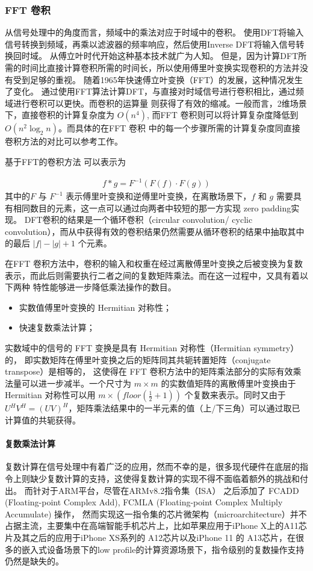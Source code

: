 \subsubsection{FFT 卷积}
从信号处理中的角度而言，频域中的乘法对应于时域中的卷积。 使用DFT将输入信号转换到频域，再乘以滤波器的频率响应，然后使用Inverse DFT将输入信号转换回时域。
从傅立叶时代开始这种基本技术就广为人知。 但是，因为计算DFT所需的时间比直接计算卷积所需的时间长，所以使用傅里叶变换实现卷积的方法并没有受到足够的重视。
随着1965年快速傅立叶变换（FFT）的发展，这种情况发生了变化。 通过使用FFT算法计算DFT，与直接对时域信号进行卷积相比，通过频域进行卷积可以更快。而卷积的运算量
则获得了有效的缩减。一般而言，2维场景下，直接卷积的计算复杂度为 $O(n^4)$, 而FFT 卷积则可以将计算复杂度降低到 $O(n^2 \log_{2}n)$。而具体的在FFT 卷积
中的每一个步骤所需的计算复杂度同直接卷积方法的对比可以参考工作\cite{Mathieu2013FastTO}。

基于FFT的卷积方法\cite{Zlateski2018FFTCA} \cite{Mathieu2013FastTO}可以表示为

\begin{align}
  f * g = F^{-1}(F(f)  \cdot F(g))
\end{align}
其中的$F$ 与 $F^{-1}$ 表示傅里叶变换和逆傅里叶变换，在离散场景下，$f$ 和 $g$ 需要具有相同数目的元素，这一点可以通过向两者中较短的那一方实现 zero padding实现。
DFT卷积的结果是一个循环卷积（circular convolution/ cyclic convolution），而从中获得有效的卷积结果仍然需要从循环卷积的结果中抽取其中的最后 $|f| - |g| + 1 $
个元素。

在FFT 卷积方法中，卷积的输入和权重在经过离散傅里叶变换之后被变换为复数表示，而此后则需要执行二者之间的复数矩阵乘法。而在这一过程中，又具有着以下两种
特性能够进一步降低乘法操作的数目。

\begin{itemize}
  \item 实数值傅里叶变换的 Hermitian 对称性；
  \item 快速复数乘法计算；
\end{itemize}

实数域中的信号的 FFT 变换是具有 Hermitian 对称性（Hermitian symmetry）的， 即实数矩阵在傅里叶变换之后的矩阵同其共轭转置矩阵（conjugate transpose）是相等的，
这使得在 FFT 卷积方法中的矩阵乘法部分的实际有效乘法量可以进一步减半。一个尺寸为 $m \times m$ 的实数值矩阵的离散傅里叶变换由于 Hermitian 对称性可以用 $m \times(floor(\frac{1}{2} + 1))$ 
个复数来表示。同时又由于 $ U^H V^H = ( UV )^H $，矩阵乘法结果中的一半元素的值（上/下三角）可以通过取已计算值的共轭获得。

\paragraph{复数乘法计算}
复数计算在信号处理中有着广泛的应用，然而不幸的是，很多现代硬件在底层的指令上则缺少复数计算的支持，这使得复数计算的实现不得不面临着额外的挑战和付出。
而针对于ARM平台，尽管在ARMv8.2指令集（ISA） 之后添加了 FCADD (Floating-point Complex Add), FCMLA (Floating-point Complex Multiply Accumulate) 操作，
然而实现这一指令集的芯片微架构（microarchitecture）并不占据主流，主要集中在高端智能手机芯片上，比如苹果应用于iPhone X上的A11芯片及其之后的应用于iPhone XS系列的
A12芯片以及iPhone 11 的 A13芯片，在很多的嵌入式设备场景下的low profile的计算资源场景下，指令级别的复数操作支持仍然是缺失的。

